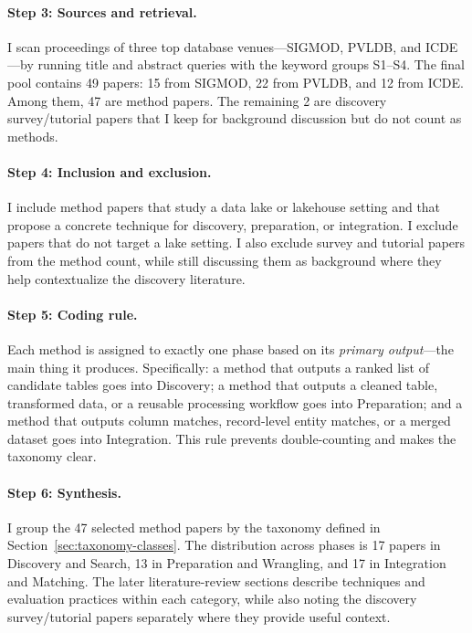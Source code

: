 \documentclass[sigconf]{acmart}
\begin{document}
\paragraph{Step 3: Sources and retrieval.}
I scan proceedings of three top database venues---SIGMOD, PVLDB, and ICDE---by running title and abstract queries with the keyword groups S1--S4.
The final pool contains 49 papers: 15 from SIGMOD, 22 from PVLDB, and 12 from ICDE. Among them, 47 are method papers. The remaining 2 are discovery survey/tutorial papers that I keep for background discussion but do not count as methods.

\paragraph{Step 4: Inclusion and exclusion.}
I include method papers that study a data lake or lakehouse setting and that propose a concrete technique for discovery, preparation, or integration. I exclude papers that do not target a lake setting. I also exclude survey and tutorial papers from the method count, while still discussing them as background where they help contextualize the discovery literature.

\paragraph{Step 5: Coding rule.}
Each method is assigned to exactly one phase based on its \emph{primary output}---the main thing it produces. Specifically: a method that outputs a ranked list of candidate tables goes into Discovery; a method that outputs a cleaned table, transformed data, or a reusable processing workflow goes into Preparation; and a method that outputs column matches, record-level entity matches, or a merged dataset goes into Integration. This rule prevents double-counting and makes the taxonomy clear.

\paragraph{Step 6: Synthesis.}
I group the 47 selected method papers by the taxonomy defined in Section~\ref{sec:taxonomy-classes}. The distribution across phases is 17 papers in Discovery and Search, 13 in Preparation and Wrangling, and 17 in Integration and Matching. The later literature-review sections describe techniques and evaluation practices within each category, while also noting the discovery survey/tutorial papers separately where they provide useful context.
\end{document}
